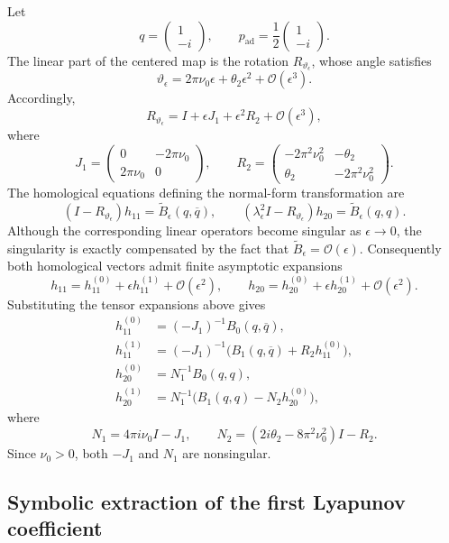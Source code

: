 \documentclass[11pt]{amsart}
\theoremstyle{remark}
\newcommand{\cO}{\mathcal{O}}
\begin{document}
Let
\[
 q=\begin{pmatrix}1\\-i\end{pmatrix},
 \qquad
 p_{\mathrm{ad}}=\frac12\begin{pmatrix}1\\-i\end{pmatrix}.
\]
The linear part of the centered map is the rotation
\(R_{\vartheta_\epsilon}\), whose angle satisfies
\[
 \vartheta_\epsilon=2\pi\nu_0\epsilon+\theta_2\epsilon^2+\cO(\epsilon^3).
\]
Accordingly,
\[
 R_{\vartheta_\epsilon}=I+\epsilon J_1+\epsilon^2R_2+\cO(\epsilon^3),
\]
where
\[
 J_1=
\begin{pmatrix}
0&-2\pi\nu_0\\
2\pi\nu_0&0
\end{pmatrix},
\qquad
 R_2=
\begin{pmatrix}
-2\pi^2\nu_0^2&-\theta_2\\
\theta_2&-2\pi^2\nu_0^2
\end{pmatrix}.
\]
The homological equations defining the normal-form transformation are
\[
 (I-R_{\vartheta_\epsilon})h_{11}
=\widetilde B_\epsilon(q,\overline q),
\qquad
 (\lambda_\epsilon^2I-R_{\vartheta_\epsilon})h_{20}
=\widetilde B_\epsilon(q,q).
\]
Although the corresponding linear operators become singular as
\(\epsilon\to0\), the singularity is exactly compensated by the fact that
\(\widetilde B_\epsilon=\cO(\epsilon)\).  Consequently both homological
vectors admit finite asymptotic expansions
\[
 h_{11}=h_{11}^{(0)}+\epsilon h_{11}^{(1)}+\cO(\epsilon^2),
 \qquad
 h_{20}=h_{20}^{(0)}+\epsilon h_{20}^{(1)}+\cO(\epsilon^2).
\]
Substituting the tensor expansions above gives
\[
\begin{aligned}
h_{11}^{(0)}
&=(-J_1)^{-1}B_0(q,\overline q),\\
h_{11}^{(1)}
&=(-J_1)^{-1}\bigl(B_1(q,\overline q)+R_2h_{11}^{(0)}\bigr),\\
h_{20}^{(0)}
&=N_1^{-1}B_0(q,q),\\
h_{20}^{(1)}
&=N_1^{-1}\bigl(B_1(q,q)-N_2h_{20}^{(0)}\bigr),
\end{aligned}
\]
where
\[
 N_1=4\pi i\nu_0I-J_1,
\qquad
 N_2=(2i\theta_2-8\pi^2\nu_0^2)I-R_2.
\]
Since \(\nu_0>0\), both \(-J_1\) and \(N_1\) are nonsingular.

\subsection{Symbolic extraction of the first Lyapunov coefficient}
\end{document}
